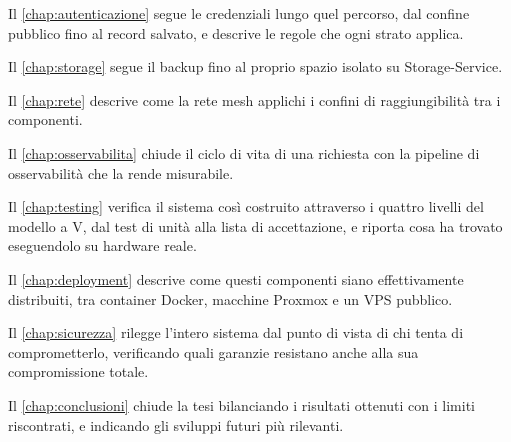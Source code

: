 Il \autoref{chap:autenticazione} segue le credenziali lungo quel percorso, dal confine pubblico fino al
record salvato, e descrive le regole che ogni strato applica.

Il \autoref{chap:storage} segue il backup fino al proprio spazio isolato su Storage-Service.

Il \autoref{chap:rete} descrive come la rete mesh applichi i confini di raggiungibilità tra i
componenti.

Il \autoref{chap:osservabilita} chiude il ciclo di vita di una richiesta con la pipeline di
osservabilità che la rende misurabile.

Il \autoref{chap:testing} verifica il sistema così costruito attraverso i quattro livelli del modello a
V, dal test di unità alla lista di accettazione, e riporta cosa ha trovato eseguendolo su hardware reale.

Il \autoref{chap:deployment} descrive come questi componenti siano effettivamente distribuiti, tra
container Docker, macchine Proxmox e un VPS pubblico.

Il \autoref{chap:sicurezza} rilegge l'intero sistema dal punto di vista di chi tenta di comprometterlo,
verificando quali garanzie resistano anche alla sua compromissione totale.

Il \autoref{chap:conclusioni} chiude la tesi bilanciando i risultati ottenuti con i limiti riscontrati,
e indicando gli sviluppi futuri più rilevanti.
